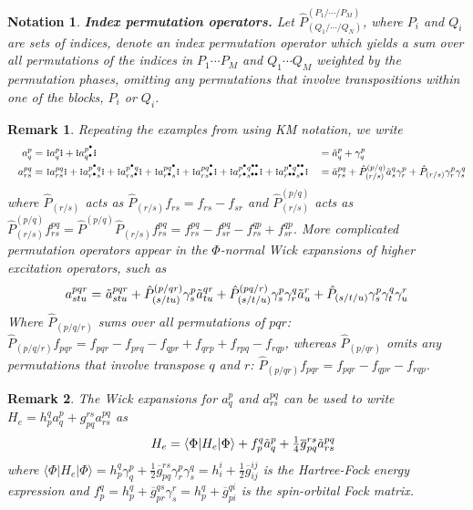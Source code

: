 \documentclass[11pt,fleqn]{article}
\newcommand{\g}{\gamma}      %
\newcommand{\F}{\Phi}        %
\newcommand{\tl}{\ensuremath{\tilde}}
\newcommand{\ol}[1]{\ensuremath{\overline{#1}}}
\newcommand{\op}[1]{\ensuremath{\hat{#1}}}
\newcommand{\cd}{\ensuremath{\cdots}}
\newcommand{\bmit}[1]{{\bfseries\itshape\mathversion{bold}#1}}
\newcommand{\ip}[1]{\ensuremath{\langle#1\rangle}}
\newcommand{\GNO}[1]{\setstackgap{S}{0.7pt}\ensuremath{\Shortstack{\textbf{.} \textbf{.} \textbf{.}}#1\Shortstack{\textbf{.} \textbf{.} \textbf{.}}}}
\theoremstyle{mystyle}
\newtheorem{rmk}{Remark}[section]
\newtheorem{ntt}{Notation}[section]
\numberwithin{equation}{section}
\newcommand{\ptcl}{\bullet}
\begin{document}
\begin{ntt}
\label{index-permutation-operator}
\bmit{Index permutation operators.}
Let $\op{P}^{(P_1/\cd/P_M)}_{(Q_1/\cd/Q_N)}$, where $P_i$ and $Q_i$ are sets of indices, denote an \textit{index permutation operator} which yields a sum over all permutations of the indices in $P_1\cd P_M$ and $Q_1\cd Q_M$ weighted by the permutation phases, omitting any permutations that involve transpositions within one of the blocks, $P_i$ or $Q_i$.
\end{ntt}


\begin{rmk}
\label{km-notation-example}
Repeating the examples from  using KM notation, we write
\begin{align*}
&&
  a_q^p
=&\
  \GNO{a_q^p}
+
  \GNO{a_{q^\ptcl}^{p^\ptcl}}
&&=
  \tl{a}_q^p
+
  \g_q^p
\\
&&
  a_{rs}^{pq}
=&\
  \GNO{a_{rs}^{pq}}
+
  \GNO{a_{r^\ptcl s}^{p^\ptcl q}}
+
  \GNO{a_{rs^\ptcl}^{p^\ptcl q}}
+
  \GNO{a_{r^\ptcl s}^{pq^\ptcl}}
+
  \GNO{a_{rs^\ptcl}^{pq^\ptcl}}
+
  \GNO{a_{r^\ptcl s^{\ptcl\ptcl}}^{p^\ptcl q^{\ptcl\ptcl}}}
+
  \GNO{a_{r^{\ptcl\ptcl} s^\ptcl}^{p^\ptcl q^{\ptcl\ptcl}}}
&&=
  \tl{a}_{rs}^{pq}
+
  \op{P}_{(r/s)}^{(p/q)}
  \tl{a}_s^q\g_r^p
+
  \op{P}_{(r/s)}
  \g_r^p\g_s^q
\end{align*}
where $\op{P}_{(r/s)}$ acts as $\op{P}_{(r/s)}f_{rs} = f_{rs} - f_{sr}$ and $\op{P}_{(r/s)}^{(p/q)}$ acts as $\op{P}_{(r/s)}^{(p/q)}f_{rs}^{pq}=\op{P}^{(p/q)}\op{P}_{(r/s)}f_{rs}^{pq}=f_{rs}^{pq}-f_{sr}^{pq}-f_{rs}^{qp}+f_{sr}^{qp}$.
More complicated permutation operators appear in the $\F$-normal Wick expansions of higher excitation operators, such as
\begin{align*}
&&
  a_{stu}^{pqr}
=&\
  \tl{a}_{stu}^{pqr}
+
  \op{P}_{(s/tu)}^{(p/qr)}
  \g_s^p\tl{a}_{tu}^{qr}
+
  \op{P}_{(s/t/u)}^{(pq/r)}
  \g_s^p
  \g_r^q
  \tl{a}_u^r
+
  \op{P}_{(s/t/u)}
  \g_s^p
  \g_t^q
  \g_u^r
\end{align*}
Where $\op{P}_{(p/q/r)}$ sums over all permutations of $pqr$: $\op{P}_{(p/q/r)}f_{pqr}=f_{pqr}-f_{prq}-f_{qpr}+f_{qrp}+f_{rpq}-f_{rqp}$, whereas $\op{P}_{(p/qr)}$ omits any permutations that involve transpose $q$ and $r$: $\op{P}_{(p/qr)}f_{pqr}=f_{pqr}-f_{qpr}-f_{rqp}$.
\end{rmk}

\begin{rmk}
\label{phi-normal-expansion-of-hamiltonian}
The Wick expansions for $a_q^p$ and $a_{rs}^{pq}$ can be used to write $H_e=h_p^qa_q^p+g_{pq}^{rs}a_{rs}^{pq}$ as
\begin{align*}
&&
  H_e
=
  \ip{\F|H_e|\F}
+
  f_p^q\tl{a}_q^p
+
  \tfrac{1}{4}
  \ol{g}_{pq}^{rs}
  \tl{a}_{rs}^{pq}
\end{align*}
where $\ip{\F|H_e|\F}=h_p^q\g_q^p+\frac{1}{2}\ol{g}_{pq}^{rs}\g_r^p\g_s^q=h_i^i+\frac{1}{2}\ol{g}_{ij}^{ij}$ is the Hartree-Fock energy expression and $f_p^q=h_p^q+\ol{g}_{pr}^{qs}\g_s^r=h_p^q+\ol{g}_{pi}^{qi}$ is the spin-orbital Fock matrix.
\end{rmk}
\end{document}

